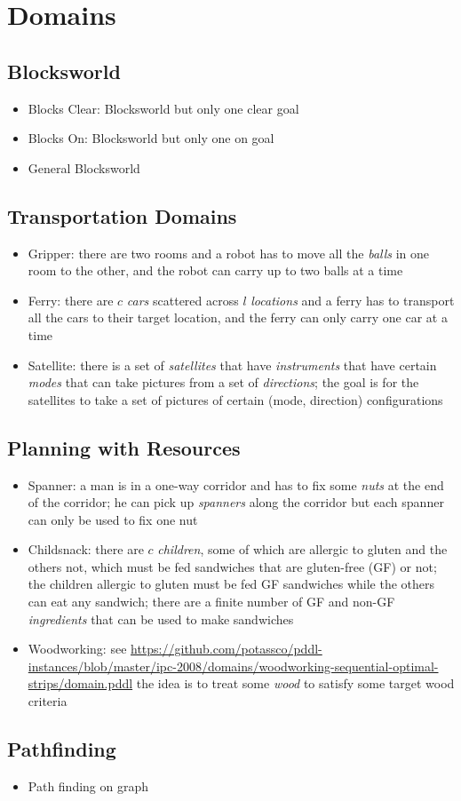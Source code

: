 \documentclass{article}
\begin{document}
\section{Domains}
\subsection{Blocksworld}
\begin{itemize}
    \item Blocks Clear: Blocksworld but only one clear goal
    \item Blocks On: Blocksworld but only one on goal
    \item General Blocksworld
\end{itemize}
\subsection{Transportation Domains}
\begin{itemize}
    \item Gripper: there are two rooms and a robot has to move all the \emph{balls} in one room to the other, and the robot can carry up to two balls at a time
    \item Ferry: there are $c$ \emph{cars} scattered across $l$ \emph{locations} and a ferry has to transport all the cars to their target location, and the ferry can only carry one car at a time
    \item Satellite: there is a set of \emph{satellites} that have \emph{instruments} that have certain \emph{modes} that can take pictures from a set of \emph{directions}; the goal is for the satellites to take a set of pictures of certain (mode, direction) configurations 
\end{itemize}
\subsection{Planning with Resources}
\begin{itemize}
    \item Spanner: a man is in a one-way corridor and has to fix some \emph{nuts} at the end of the corridor; he can pick up \emph{spanners} along the corridor but each spanner can only be used to fix one nut
    \item Childsnack: there are $c$ \emph{children}, some of which are allergic to gluten and the others not, which must be fed sandwiches that are gluten-free (GF) or not; the children allergic to gluten must be fed GF sandwiches while the others can eat any sandwich; there are a finite number of GF and non-GF \emph{ingredients} that can be used to make sandwiches
    \item Woodworking: see \url{https://github.com/potassco/pddl-instances/blob/master/ipc-2008/domains/woodworking-sequential-optimal-strips/domain.pddl} the idea is to treat some \emph{wood} to satisfy some target wood criteria
\end{itemize}
\subsection{Pathfinding}
\begin{itemize}
    \item Path finding on graph
\end{itemize}
\end{document}
